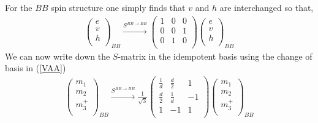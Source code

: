 For the $BB$ spin structure one simply finds that $v$ and $h$ are interchanged so that,
\begin{align}
\left( \begin{matrix}
e\\
v\\
h\\
\end{matrix} \right)_{BB}
\xrightarrow{S^{BB \rightarrow BB}}
\left(\begin{matrix}
1& 0& 0 \\
0& 0&1  \\
0&1 &0 \\ 
\end{matrix} \right)
\left( \begin{matrix}
e\\
v\\
h\\
\end{matrix} \right)_{BB}
\end{align}
We can now write down the $S$-matrix in the idempotent basis using the change of basis in (\ref{VAA})
\begin{align}
\left( \begin{matrix}
m_1\\
m_2\\
m_3^+\\
\end{matrix} \right)_{BB} \xrightarrow{S^{BB \rightarrow BB}} 
\frac{1}{\sqrt{3}}\left( \begin{matrix}
\frac{1}{d} & \frac{d}{2} & 1\\ 
\frac{d}{2} & \frac{1}{d} & -1\\
1 & -1 & 1\\
\end{matrix} \right)
\left( \begin{matrix}
m_1\\
m_2\\
m_3^+\\
\end{matrix} \right)_{BB}
\end{align}

